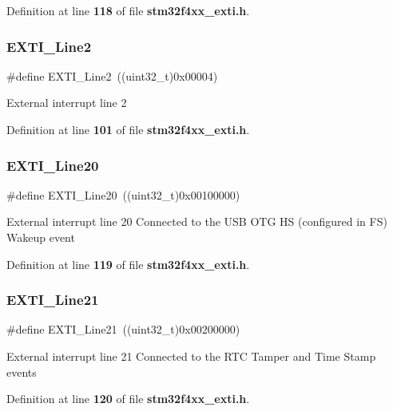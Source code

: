 Definition at line \textbf{ 118} of file \textbf{ stm32f4xx\+\_\+exti.\+h}.

\mbox{\label{group__EXTI__Lines_gaec4189bb2709c8c15a0339d1b0b9865a}} 
\subsubsection{E\+X\+T\+I\+\_\+\+Line2}
{\footnotesize\ttfamily \#define E\+X\+T\+I\+\_\+\+Line2~((uint32\+\_\+t)0x00004)}

External interrupt line 2 

Definition at line \textbf{ 101} of file \textbf{ stm32f4xx\+\_\+exti.\+h}.

\mbox{\label{group__EXTI__Lines_ga3ebc4564ac4ca4e1613f98d81a707f2a}} 
\subsubsection{E\+X\+T\+I\+\_\+\+Line20}
{\footnotesize\ttfamily \#define E\+X\+T\+I\+\_\+\+Line20~((uint32\+\_\+t)0x00100000)}

External interrupt line 20 Connected to the U\+SB O\+TG HS (configured in FS) Wakeup event 

Definition at line \textbf{ 119} of file \textbf{ stm32f4xx\+\_\+exti.\+h}.

\mbox{\label{group__EXTI__Lines_ga273edacd18e521e5a702c642c5b824af}} 
\subsubsection{E\+X\+T\+I\+\_\+\+Line21}
{\footnotesize\ttfamily \#define E\+X\+T\+I\+\_\+\+Line21~((uint32\+\_\+t)0x00200000)}

External interrupt line 21 Connected to the R\+TC Tamper and Time Stamp events 

Definition at line \textbf{ 120} of file \textbf{ stm32f4xx\+\_\+exti.\+h}.

